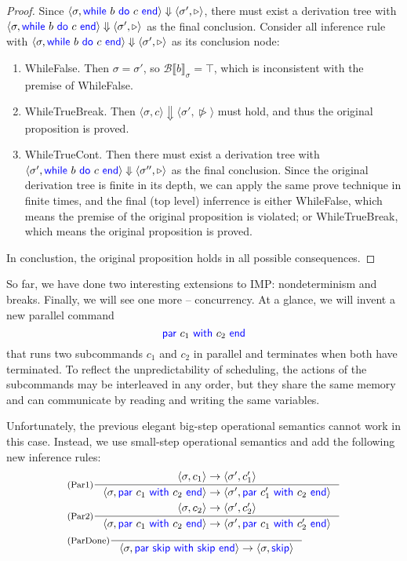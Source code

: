 \documentclass[11pt,a4paper]{article}
\let\sCont\triangleright
\let\sBreak\ntriangleright
\newcommand{\pair}[1]{\langle #1 \rangle}
\newcommand{\evalB}[2]{{\mathcal{B}\llbracket #1 \rrbracket}_{#2}}
\newcommand{\evalCsig}[4]{\pair{#1, #2} \Downarrow \pair{#3, #4}}
\newcommand{\evalCS}[4]{\pair{#1, #2} \rightarrow \pair{#3, #4}}
\newcommand{\kword}[1]{{\color{blue} \textsf{#1}}}
\newcommand{\Skip}{\kword{skip}}
\newcommand{\While}{\kword{while}}
\newcommand{\Do}{\kword{do}}
\newcommand{\End}{\kword{end}}
\newcommand{\Par}{\kword{par}}
\newcommand{\With}{\kword{with}}
\begin{document}
\begin{proof}
  Since $\evalCsig{\sigma}{\While~b~\Do~c~\End}{\sigma'}{\sCont}$, there must exist a derivation tree with $\evalCsig{\sigma}{\While~b~\Do~c~\End}{\sigma'}{\sCont}$ as the final conclusion. Consider all inference rule with $\evalCsig{\sigma}{\While~b~\Do~c~\End}{\sigma'}{\sCont}$ as its conclusion node:
  
  \begin{enumerate}
    \item WhileFalse. Then $\sigma = \sigma'$, so $\evalB{b}{\sigma} = \top$, which is inconsistent with the premise of WhileFalse.
    \item WhileTrueBreak. Then $\evalCsig{\sigma}{c}{\sigma'}{\sBreak}$ must hold, and thus the original proposition is proved.
    \item WhileTrueCont. Then there must exist a derivation tree with $\evalCsig{\sigma'}{\While~b~\Do~c~\End}{\sigma''}{\sCont}$ as the final conclusion. Since the original derivation tree is finite in its depth, we can apply the same prove technique in finite times, and the final (top level) inferrence is either WhileFalse, which means the premise of the original proposition is violated; or WhileTrueBreak, which means the original proposition is proved.
  \end{enumerate}

  In conclustion, the original proposition holds in all possible consequences.
\end{proof}

\newpage
{}

So far, we have done two interesting extensions to IMP: nondeterminism and breaks.
Finally, we will see one more -- concurrency.
At a glance, we will invent a new parallel command $$\Par~c_1~\With~c_2~\End$$ that runs two subcommands $c_1$ and $c_2$ in parallel and terminates when both have terminated.
To reflect the unpredictability of scheduling, the actions of the subcommands may be interleaved in any order, but they share the same memory and can communicate by reading and writing the same variables.

Unfortunately, the previous elegant big-step operational semantics cannot work in this case.
Instead, we use small-step operational semantics and add the following new inference rules:
\begin{align*}
	& \inference[(Par1)]{\evalCS{\sigma}{c_1}{\sigma'}{c_1'}}
		{\evalCS{\sigma}{\Par~c_1~\With~c_2~\End}{\sigma'}{\Par~c_1'~\With~c_2~\End}} \\
	& \inference[(Par2)]{\evalCS{\sigma}{c_2}{\sigma'}{c_2'}}
		{\evalCS{\sigma}{\Par~c_1~\With~c_2~\End}{\sigma'}{\Par~c_1~\With~c_2'~\End}} \\
	& \inference[(ParDone)]{}{\evalCS{\sigma}{\Par~\Skip~\With~\Skip~\End}{\sigma}{\Skip}}
\end{align*}
\end{document}
